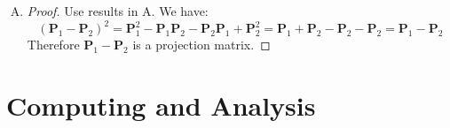 \documentclass[12pt]{article}
\newcommand{\ttt}[1]{\textbf{#1}}
\begin{document}
\begin{enumerate}
\begin{enumerate}[A.]
\begin{proof}
            Because:
            $$(\ttt{I} - \ttt{P}_1)^\top \ttt{P}_2 (\ttt{I} - \ttt{P}_1) = (\ttt{I} - \ttt{P}_1)^\top \ttt{P}_2^\top \ttt{P}_2 (\ttt{I} - \ttt{P}_1) = (\ttt{P}_2 (\ttt{I} - \ttt{P}_1))^\top \ttt{P}_2 (\ttt{I} - \ttt{P}_1) = \ttt{0}$$ 
            We have $\ttt{P}_2 (\ttt{I} - \ttt{P}_1) = \ttt{0}$, which shows $\ttt{P}_2 = \ttt{P}_2 \ttt{P}_1$.
            Meanwhile we have $$\ttt{P}_2 = \ttt{P}_2^\top = (\ttt{P}_2 \ttt{P}_1)^\top = \ttt{P}_1^\top \ttt{P}_2^\top = \ttt{P}_1 \ttt{P}_2$$
            Therefore $\ttt{P}_1 \ttt{P}_2 = \ttt{P}_2 \ttt{P}_1 = \ttt{P}_2$.
        \end{proof}

        \item 
        \begin{proof}
            Use results in A. We have:
            $$(\ttt{P}_1 - \ttt{P}_2)^2 = \ttt{P}_1^2 - \ttt{P}_1\ttt{P}_2 -\ttt{P}_2\ttt{P}_1 + \ttt{P}_2^2 = \ttt{P}_1 + \ttt{P}_2 - \ttt{P}_2 - \ttt{P}_2 = \ttt{P}_1 - \ttt{P}_2$$
            Therefore $\ttt{P}_1 - \ttt{P}_2$ is a projection matrix.
        \end{proof}
    \end{enumerate}

\end{enumerate}

\section{Computing and Analysis}

\end{document}
